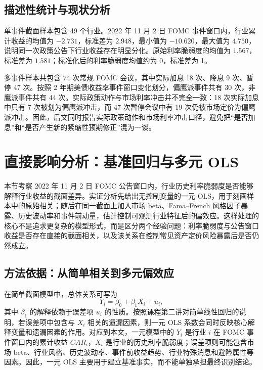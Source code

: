 \documentclass[UTF8,zihao=-4]{ctexart}
\begin{document}
\subsection{描述性统计与现状分析}

单事件截面样本包含 49 个行业。2022 年 11 月 2 日 FOMC 事件窗口内，行业累计收益的均值为 $-2.731$，标准差为 $2.948$，最小值为 $-10.620$，最大值为 $4.750$，说明同一次政策公告下行业收益存在明显分化。原始利率脆弱度的均值为 $1.567$，标准差为 $1.581$；标准化后的利率脆弱度均值约为 0，标准差为 1。

多事件样本共包含 74 次常规 FOMC 会议，其中实际加息 18 次、降息 9 次、暂停 47 次。按照 2 年期美债收益率事件窗口变化划分，偏鹰派事件共有 30 次，非鹰派事件共有 44 次。实际政策动作与市场利率冲击并不完全一致：18 次实际加息中只有 7 次被划为偏鹰派冲击，而 47 次暂停会议中有 19 次仍被市场定价为偏鹰派冲击。因此，后文同时报告实际政策动作和市场利率冲击口径，避免把“是否加息”和“是否产生新的紧缩性预期修正”混为一谈。

\section{直接影响分析：基准回归与多元 OLS}
\label{sec:direct_effect}

本节考察 2022 年 11 月 2 日 FOMC 公告窗口内，行业历史利率脆弱度是否能够解释行业收益的截面差异。实证分析先给出无控制变量的一元 OLS，用于刻画样本中的原始相关；随后在同一截面上加入市场 beta、Fama--French 风格因子暴露、历史波动率和事件前动量，估计控制可观测行业特征后的偏效应。这样处理的核心不是追求更复杂的模型形式，而是区分两个经验问题：利率脆弱度与公告窗口收益是否存在直接的截面相关，以及该关系在控制常见资产定价风险暴露后是否仍然成立。

\subsection{方法依据：从简单相关到多元偏效应}
\label{subsec:direct_method}

在简单截面模型中，总体关系可写为
\[
Y_i=\beta_0+\beta_1 X_i+u_i,
\]
其中 $\beta_1$ 的解释依赖于误差项 $u_i$ 的性质。按照课程第二讲对简单线性回归的说明，若误差项中包含与 $X_i$ 相关的遗漏因素，则一元 OLS 系数会同时反映核心解释变量和遗漏因素的作用。对应到本文，一元模型中的 $Y_i$ 是行业 $i$ 在 FOMC 事件窗口内的累计收益 $CAR_i$，$X_i$ 是行业的历史利率脆弱度；误差项则可能包含市场 beta、行业风格、历史波动率、事件前收益趋势、行业特殊消息和避险属性等因素。因此，一元 OLS 主要用于建立基准事实，而不能单独承担最终识别结论。
\end{document}
